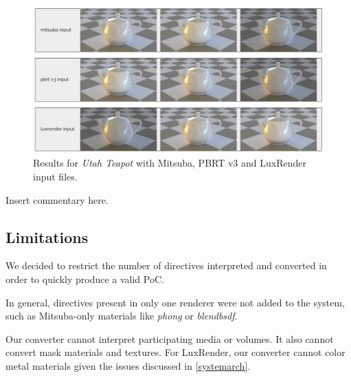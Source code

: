 \begin{figure}[h]
\centering
\includegraphics[width=5in]{figs/4_results/results_teapot.png}
\caption{Results for \textit{Utah Teapot} with Mitsuba, PBRT v3 and LuxRender input files.}
\label{fig:teapot}
\end{figure}

Insert commentary here.

\subsection{Limitations}
We decided to restrict the number of directives interpreted and converted in order to quickly produce a valid PoC.

In general, directives present in only one renderer were not added to the system, such as Mitsuba-only materials like \textit{phong} or \textit{blendbsdf}.

Our converter cannot interpret participating media or volumes. It also cannot convert mask materials and textures. For LuxRender, our converter cannot color metal materials given the issues discussed in \ref{systemarch}.
